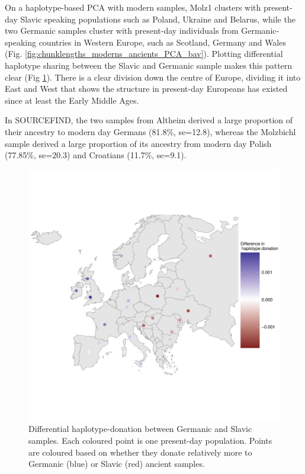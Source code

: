 On a haplotype-based PCA with modern samples, Molz1 clusters with present-day Slavic speaking populations such as Poland, Ukraine and Belarus, while the two Germanic samples cluster with present-day individuals from Germanic-speaking countries in Western Europe, such as Scotland, Germany and Wales (Fig. \ref{fig:chunklengths_moderns_ancients_PCA_bav}). Plotting differential haplotype sharing between the Slavic and Germanic sample makes this pattern clear (Fig \ref{fig:germanic_slavic_HB_sharing}). There is a clear division down the centre of Europe, dividing it into East and West that shows the structure in present-day Europeans has existed since at least the Early Middle Ages. 

In SOURCEFIND, the two samples from Altheim derived a large proportion of their ancestry to modern day Germans (81.8\%, se=12.8), whereas the Molzbichl sample derived a large proportion of its ancestry from modern day Polish (77.85\%, se=20.3) and Croatians (11.7\%, se=9.1). 

\begin{figure}[htp]
    \centering
    \includegraphics[width=1.0\textwidth]{../images/chapter4/germanic_slavic_HB_sharing.pdf}
    \caption{Differential haplotype-donation between Germanic and Slavic samples. Each coloured point is one present-day population. Points are coloured based on whether they donate relatively more to Germanic (blue) or Slavic (red) ancient samples.}
    \label{fig:germanic_slavic_HB_sharing}
\end{figure}

